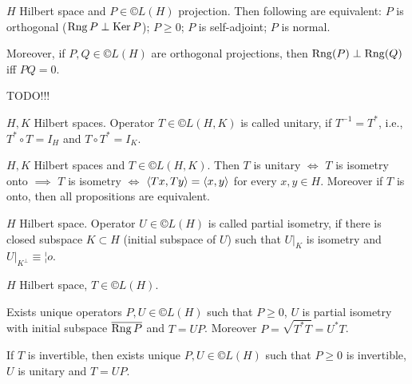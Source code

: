 \documentclass[12pt]{article}					%
\begin{document}
\begin{veta}
	$H$ Hilbert space and $P \in ©L(H)$ projection. Then following are equivalent: $P$ is orthogonal ($\operatorname{Rng} P \perp \operatorname{Ker} P$); $P ≥ 0$; $P$ is self-adjoint; $P$ is normal.

	Moreover, if $P, Q \in ©L(H)$ are orthogonal projections, then $\operatorname{Rng}(P) \perp \operatorname{Rng}(Q)$ iff $PQ = 0$.

	\begin{dukazin}
		TODO!!!
	\end{dukazin}
\end{veta}

\begin{definice}
	$H, K$ Hilbert spaces. Operator $T \in ©L(H, K)$ is called unitary, if $T^{-1} = T^*$, i.e., $T^*∘T = I_H$ and $T∘T^* = I_K$.
\end{definice}

\begin{tvrzeni}
	$H, K$ Hilbert spaces and $T \in ©L(H, K)$. Then $T$ is unitary $\Leftrightarrow$ $T$ is isometry onto $\implies$ $T$ is isometry $\Leftrightarrow$ $\left\langle Tx, Ty\right\rangle = \left\langle x, y\right\rangle$ for every $x, y \in H$. Moreover if $T$ is onto, then all propositions are equivalent.

	\begin{dukazin}
	\end{dukazin}
\end{tvrzeni}

\begin{definice}
	$H$ Hilbert space. Operator $U \in ©L(H)$ is called partial isometry, if there is closed subspace $K \subset H$ (initial subspace of $U$) such that $U|_K$ is isometry and $U|_{K^\perp} ≡ ¦o$.
\end{definice}

\begin{veta}
	$H$ Hilbert space, $T \in ©L(H)$.

	Exists unique operators $P, U \in ©L(H)$ such that $P ≥ 0$, $U$ is partial isometry with initial subspace $\overline{\operatorname{Rng} P}$ and $T = UP$. Moreover $P = \sqrt{T^* T} = U^* T$.

	If $T$ is invertible, then exists unique $P, U \in ©L(H)$ such that $P ≥ 0$ is invertible, $U$ is unitary and $T = UP$.

	\begin{dukazin}
	\end{dukazin}
\end{veta}
\end{document}
